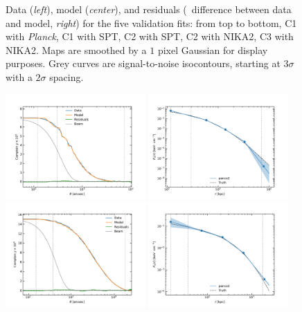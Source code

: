 \begin{figure}[tp]
    \caption{
        Data (\textit{left}), model (\textit{center}), and residuals (\ie\ difference between data and model, \textit{right}) for the five validation fits:
        from top to bottom, C1 with \textit{Planck}, C1 with SPT, C2 with SPT, C2 with NIKA2, C3 with NIKA2.
        Maps are smoothed by a $1$ pixel Gaussian for display purposes.
        Grey curves are signal-to-noise isocontours, starting at $3\sigma$ with a $2\sigma$ spacing.
    }
    \label{fig:valid:dmr_2d}
\end{figure}


\begin{figure}[tp]
    \centering
    \includegraphics[height=4cm, trim={0.5cm 0.3cm 1.3cm 1.3cm}, clip]{../validation/results/C1/Planck/data_model_residuals_profiles.pdf}
    \includegraphics[height=4cm, trim={0.5cm 0.3cm 1.3cm 1.3cm}, clip]{../validation/results/C1/Planck/pressure_profile.pdf} \\
    \includegraphics[height=4cm, trim={0.5cm 0.3cm 1.3cm 1.3cm}, clip]{../validation/results/C1/SPT/data_model_residuals_profiles.pdf}
    \includegraphics[height=4cm, trim={0.5cm 0.3cm 1.3cm 1.3cm}, clip]{../validation/results/C1/SPT/pressure_profile.pdf} \\

\end{figure}
